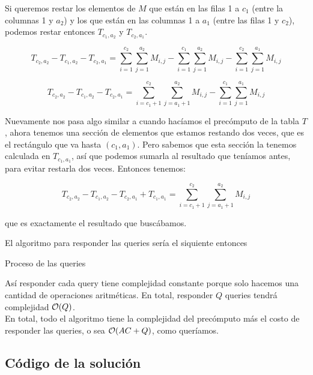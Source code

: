 Si queremos restar los elementos de $M$ que están en las filas 1 a $c_1$ 
(entre la columnas 1 y $a_2$) y los que están en las columnas 1 a $a_1$ 
(entre las filas 1 y $c_2$), podemos restar entonces $T_{c_1,a_2}$ y $T_{c_2,a_1}$. 

\begin{equation}
T_{c_2,a_2} - T_{c_1,a_2} - T_{c_2,a_1} = \sum\limits_{i = 1}^{c_2} \sum\limits_{j = 1}^{a_2} M_{i,j} - \sum\limits_{i = 1}^{c_1} \sum\limits_{j = 1}^{a_2} M_{i,j} - \sum\limits_{i = 1}^{c_2} \sum\limits_{j = 1}^{a_1} M_{i,j}
\end{equation}

\begin{equation}
T_{c_2,a_2} - T_{c_1,a_2} - T_{c_2,a_1} = \sum\limits_{i = c_1+1}^{c_2} \sum\limits_{j = a_1+1}^{a_2} M_{i,j} - \sum\limits_{i = 1}^{c_1} \sum\limits_{j = 1}^{a_1} M_{i,j} 
\end{equation}

Nuevamente nos pasa algo similar a cuando hacíamos el precómputo de la tabla $T$, 
ahora tenemos una sección de elementos que estamos restando dos veces, que es el 
rectángulo que va hasta $(c_1,a_1)$. Pero sabemos que esta sección la tenemos calculada 
en $T_{c_1,a_1}$, así que podemos sumarla al resultado que teníamos antes, para evitar 
restarla dos veces. Entonces tenemos: 

\begin{equation}
T_{c_2,a_2} - T_{c_1,a_2} - T_{c_2,a_1} + T_{c_1,a_1} = \sum\limits_{i = c_1+1}^{c_2} \sum\limits_{j = a_1+1}^{a_2} M_{i,j}
\end{equation}

que es exactamente el resultado que buscábamos. 

El algoritmo para responder las queries sería el siquiente entonces 


\begin{algorithm}[H]
\caption{Proceso de las queries}
\end{algorithm}

Así responder cada query tiene complejidad constante porque solo hacemos 
una cantidad de operaciones aritméticas. En total, responder $Q$ queries tendrá 
complejidad $\mathcal{O}(Q)$. \\

En total, todo el algoritmo tiene la complejidad del precómputo más el costo de 
responder las queries, o sea $\mathcal{O}(AC + Q)$, como queríamos. 

\newpage
\subsection{Código de la solución}

